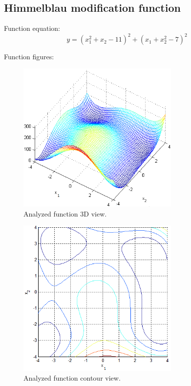\documentclass[12pt]{article}
\begin{document}
\subsection{Himmelblau modification function}
Function equation:
\begin{equation}
	y=(x_1^2+x_2-11)^2 +(x_1+x_2^2-7)^2
\end{equation}

Function figures:
\begin{figure}[H]
	\includegraphics[width=8cm]{himm.png}
	\caption{Analyzed function 3D view.}
\end{figure}
\begin{figure}[H]
	\includegraphics[width=8cm]{himm_count.png}
	\caption{Analyzed function contour view.}
\end{figure}
\end{document}
